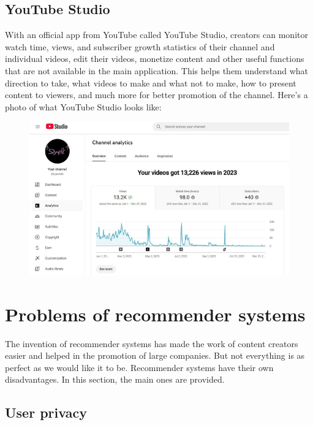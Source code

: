 \documentclass[12pt]{article}
\begin{document}
\subsection{YouTube Studio}

With an official app from YouTube called YouTube Studio, creators can monitor watch time, views, and subscriber growth statistics of their channel and individual videos, edit their videos, monetize content and other useful functions that are not available in the main application. This helps them understand what direction to take, what videos to make and what not to make, how to present content to viewers, and much more for better promotion of the channel. Here's a photo of what YouTube Studio looks like:

\begin{figure}[H]  %
    \centering     %
    \includegraphics[width=1\textwidth]{image4.png}
\end{figure}

\cite{4.2}

\section{Problems of recommender systems}

The invention of recommender systems has made the work of content creators easier and helped in the promotion of large companies. But not everything is as perfect as we would like it to be. Recommender systems have their own disadvantages. In this section, the main ones are provided. 

\subsection{User privacy}
\end{document}

